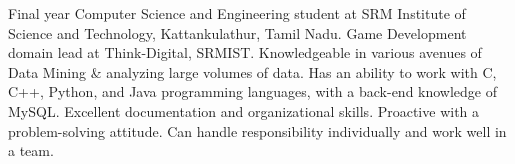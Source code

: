 %
%
%
\par{
Final year Computer Science and Engineering student at SRM Institute of Science and Technology, Kattankulathur, Tamil Nadu. Game Development domain lead at Think-Digital, SRMIST. Knowledgeable in various avenues of Data Mining \& analyzing large volumes of data. Has an ability to work with C, C++, Python, and Java programming languages, with a back-end knowledge of MySQL. Excellent documentation and organizational skills. Proactive with a problem-solving attitude. Can handle responsibility individually and work well in a team.
}